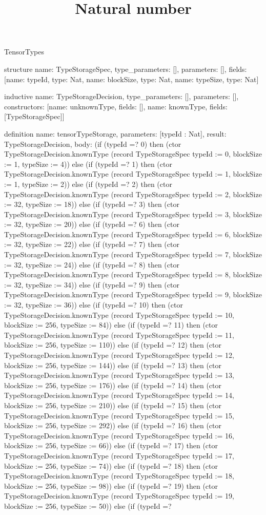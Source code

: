 \begin{lexlean}{TensorTypes}
\title{Natural number}
\begin{semanticmodule}
structure{
  name: TypeStorageSpec,
  type_parameters: [],
  parameters: [],
  fields: [{name: typeId, type: Nat}, {name: blockSize, type: Nat}, {name: typeSize, type: Nat}]
}

inductive{
  name: TypeStorageDecision,
  type_parameters: [],
  parameters: [],
  constructors: [{name: unknownType, fields: []}, {name: knownType, fields: [TypeStorageSpec]}]
}

definition{
  name: tensorTypeStorage,
  parameters: [typeId : Nat],
  result: TypeStorageDecision,
  body: (if (typeId =? 0) then (ctor TypeStorageDecision.knownType (record TypeStorageSpec {typeId := 0, blockSize := 1, typeSize := 4})) else (if (typeId =? 1) then (ctor TypeStorageDecision.knownType (record TypeStorageSpec {typeId := 1, blockSize := 1, typeSize := 2})) else (if (typeId =? 2) then (ctor TypeStorageDecision.knownType (record TypeStorageSpec {typeId := 2, blockSize := 32, typeSize := 18})) else (if (typeId =? 3) then (ctor TypeStorageDecision.knownType (record TypeStorageSpec {typeId := 3, blockSize := 32, typeSize := 20})) else (if (typeId =? 6) then (ctor TypeStorageDecision.knownType (record TypeStorageSpec {typeId := 6, blockSize := 32, typeSize := 22})) else (if (typeId =? 7) then (ctor TypeStorageDecision.knownType (record TypeStorageSpec {typeId := 7, blockSize := 32, typeSize := 24})) else (if (typeId =? 8) then (ctor TypeStorageDecision.knownType (record TypeStorageSpec {typeId := 8, blockSize := 32, typeSize := 34})) else (if (typeId =? 9) then (ctor TypeStorageDecision.knownType (record TypeStorageSpec {typeId := 9, blockSize := 32, typeSize := 36})) else (if (typeId =? 10) then (ctor TypeStorageDecision.knownType (record TypeStorageSpec {typeId := 10, blockSize := 256, typeSize := 84})) else (if (typeId =? 11) then (ctor TypeStorageDecision.knownType (record TypeStorageSpec {typeId := 11, blockSize := 256, typeSize := 110})) else (if (typeId =? 12) then (ctor TypeStorageDecision.knownType (record TypeStorageSpec {typeId := 12, blockSize := 256, typeSize := 144})) else (if (typeId =? 13) then (ctor TypeStorageDecision.knownType (record TypeStorageSpec {typeId := 13, blockSize := 256, typeSize := 176})) else (if (typeId =? 14) then (ctor TypeStorageDecision.knownType (record TypeStorageSpec {typeId := 14, blockSize := 256, typeSize := 210})) else (if (typeId =? 15) then (ctor TypeStorageDecision.knownType (record TypeStorageSpec {typeId := 15, blockSize := 256, typeSize := 292})) else (if (typeId =? 16) then (ctor TypeStorageDecision.knownType (record TypeStorageSpec {typeId := 16, blockSize := 256, typeSize := 66})) else (if (typeId =? 17) then (ctor TypeStorageDecision.knownType (record TypeStorageSpec {typeId := 17, blockSize := 256, typeSize := 74})) else (if (typeId =? 18) then (ctor TypeStorageDecision.knownType (record TypeStorageSpec {typeId := 18, blockSize := 256, typeSize := 98})) else (if (typeId =? 19) then (ctor TypeStorageDecision.knownType (record TypeStorageSpec {typeId := 19, blockSize := 256, typeSize := 50})) else (if (typeId =? }
\end{semanticmodule}
\end{lexlean}

